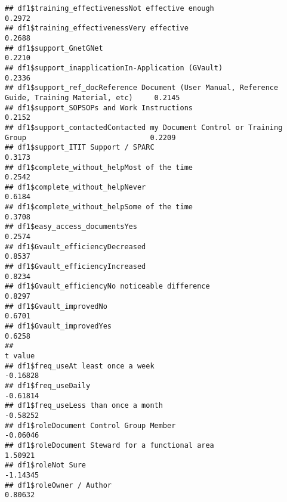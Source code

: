 \documentclass[
]{article}
\begin{document}
\begin{verbatim}
## df1$training_effectivenessNot effective enough                                                   0.2972
## df1$training_effectivenessVery effective                                                         0.2688
## df1$support_GnetGNet                                                                             0.2210
## df1$support_inapplicationIn-Application (GVault)                                                 0.2336
## df1$support_ref_docReference Document (User Manual, Reference Guide, Training Material, etc)     0.2145
## df1$support_SOPSOPs and Work Instructions                                                        0.2152
## df1$support_contactedContacted my Document Control or Training Group                             0.2209
## df1$support_ITIT Support / SPARC                                                                 0.3173
## df1$complete_without_helpMost of the time                                                        0.2542
## df1$complete_without_helpNever                                                                   0.6184
## df1$complete_without_helpSome of the time                                                        0.3708
## df1$easy_access_documentsYes                                                                     0.2574
## df1$Gvault_efficiencyDecreased                                                                   0.8537
## df1$Gvault_efficiencyIncreased                                                                   0.8234
## df1$Gvault_efficiencyNo noticeable difference                                                    0.8297
## df1$Gvault_improvedNo                                                                            0.6701
## df1$Gvault_improvedYes                                                                           0.6258
##                                                                                               t value
## df1$freq_useAt least once a week                                                             -0.16828
## df1$freq_useDaily                                                                            -0.61814
## df1$freq_useLess than once a month                                                           -0.58252
## df1$roleDocument Control Group Member                                                        -0.06046
## df1$roleDocument Steward for a functional area                                                1.50921
## df1$roleNot Sure                                                                             -1.14345
## df1$roleOwner / Author                                                                        0.80632

\end{verbatim}
\end{document}
